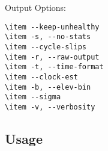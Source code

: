 Output Options:

\begin{verbatim}
\item --keep-unhealthy
\item -s, --no-stats
\item --cycle-slips
\item -r, --raw-output
\item -t, --time-format
\item --clock-est
\item -b, --elev-bin
\item --sigma
\item -v, --verbosity
\end{verbatim}



\subsection{Usage}

